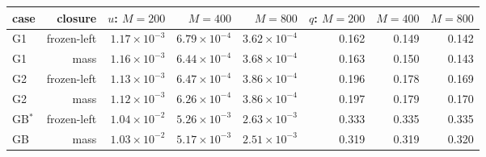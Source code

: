 \begin{tabular}{lrrrrrrr}
\toprule
case & closure & $u$: $M=200$ & $M=400$ & $M=800$ & $q$: $M=200$ & $M=400$  & $M=800$  \\
\midrule
G1 & frozen-left & $1.17\times10^{-3}$ & $6.79\times10^{-4}$ & $3.62\times10^{-4}$ & 0.162 & 0.149 & 0.142 \\
G1 & mass & $1.16\times10^{-3}$ & $6.44\times10^{-4}$ & $3.68\times10^{-4}$ & 0.163 & 0.150 & 0.143 \\
G2 & frozen-left & $1.13\times10^{-3}$ & $6.47\times10^{-4}$ & $3.86\times10^{-4}$ & 0.196 & 0.178 & 0.169 \\
G2 & mass & $1.12\times10^{-3}$ & $6.26\times10^{-4}$ & $3.86\times10^{-4}$ & 0.197 & 0.179 & 0.170 \\
GB$^{*}$ & frozen-left & $1.04\times10^{-2}$ & $5.26\times10^{-3}$ & $2.63\times10^{-3}$ & 0.333 & 0.335 & 0.335 \\
GB & mass & $1.03\times10^{-2}$ & $5.17\times10^{-3}$ & $2.51\times10^{-3}$ & 0.319 & 0.319 & 0.320 \\
\bottomrule
\end{tabular}
